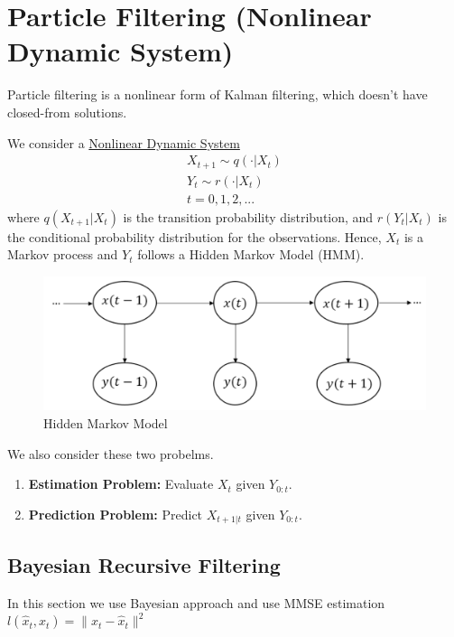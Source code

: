 \documentclass[11pt]{elegantbook}
\begin{document}
\section{Particle Filtering (Nonlinear Dynamic System)}
Particle filtering is a nonlinear form of Kalman filtering, which doesn't have closed-from solutions.

We consider a \underline{Nonlinear Dynamic System}
\begin{equation}
    \begin{aligned}
        X_{t+1}\sim q(\cdot|X_t)\\
        Y_{t}\sim r(\cdot|X_t)\\t=0,1,2,...
    \end{aligned}
    \nonumber
\end{equation}
where $q(X_{t+1}|X_t)$ is the transition probability distribution, and $r(Y_t|X_t)$ is the conditional probability distribution for the observations. Hence, $X_t$ is a Markov process and $Y_t$ follows a Hidden Markov Model (HMM).
\begin{center}\begin{figure}[htbp]
    \centering
    \includegraphics[scale=0.2]{HMM.png}
    \caption{Hidden Markov Model}
    \label{}
\end{figure}\end{center}
We also consider these two probelms.
\begin{enumerate}
    \item \textbf{Estimation Problem:} Evaluate $X_t$ given $Y_{0:t}$.
    \item \textbf{Prediction Problem:} Predict $X_{t+1|t}$ given $Y_{0:t}$.
\end{enumerate}

\subsection{Bayesian Recursive Filtering}
In this section we use Bayesian approach and use MMSE estimation $l(\hat{x}_t,x_t)=\|x_t-\hat{x}_t\|^2$
\end{document}
